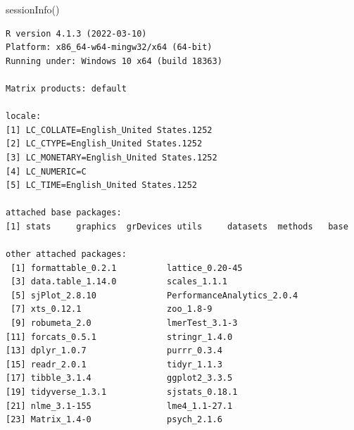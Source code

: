\documentclass[
  11pt,
]{book}
\newenvironment{Shaded}{\begin{snugshade}}{\end{snugshade}}
\newcommand{\FunctionTok}[1]{\textcolor[rgb]{0.00,0.00,0.00}{#1}}
\newcommand{\NormalTok}[1]{#1}
\begin{document}
\begin{Shaded}
\begin{Highlighting}[]
\FunctionTok{sessionInfo}\NormalTok{()}
\end{Highlighting}
\end{Shaded}

\begin{verbatim}
R version 4.1.3 (2022-03-10)
Platform: x86_64-w64-mingw32/x64 (64-bit)
Running under: Windows 10 x64 (build 18363)

Matrix products: default

locale:
[1] LC_COLLATE=English_United States.1252 
[2] LC_CTYPE=English_United States.1252   
[3] LC_MONETARY=English_United States.1252
[4] LC_NUMERIC=C                          
[5] LC_TIME=English_United States.1252    

attached base packages:
[1] stats     graphics  grDevices utils     datasets  methods   base     

other attached packages:
 [1] formattable_0.2.1          lattice_0.20-45           
 [3] data.table_1.14.0          scales_1.1.1              
 [5] sjPlot_2.8.10              PerformanceAnalytics_2.0.4
 [7] xts_0.12.1                 zoo_1.8-9                 
 [9] robumeta_2.0               lmerTest_3.1-3            
[11] forcats_0.5.1              stringr_1.4.0             
[13] dplyr_1.0.7                purrr_0.3.4               
[15] readr_2.0.1                tidyr_1.1.3               
[17] tibble_3.1.4               ggplot2_3.3.5             
[19] tidyverse_1.3.1            sjstats_0.18.1            
[21] nlme_3.1-155               lme4_1.1-27.1             
[23] Matrix_1.4-0               psych_2.1.6               


\end{verbatim}
\end{document}
